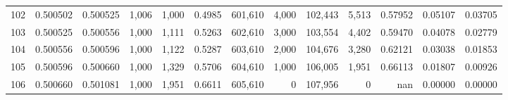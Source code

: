 \begin{tabular}{rrrrrrrrrrrrr}
102 &  0.500502 &  0.500525 &   1,006 &  1,000 &                                     0.4985 &  601,610 &    4,000 &  102,443 &    5,513 &  0.57952 &  0.05107 &  0.03705 \\
103 &  0.500525 &  0.500556 &   1,000 &  1,111 &                                     0.5263 &  602,610 &    3,000 &  103,554 &    4,402 &  0.59470 &  0.04078 &  0.02779 \\
104 &  0.500556 &  0.500596 &   1,000 &  1,122 &                                     0.5287 &  603,610 &    2,000 &  104,676 &    3,280 &  0.62121 &  0.03038 &  0.01853 \\
105 &  0.500596 &  0.500660 &   1,000 &  1,329 &                                     0.5706 &  604,610 &    1,000 &  106,005 &    1,951 &  0.66113 &  0.01807 &  0.00926 \\
106 &  0.500660 &  0.501081 &   1,000 &  1,951 &                                     0.6611 &  605,610 &        0 &  107,956 &        0 &      nan &  0.00000 &  0.00000 \\
\bottomrule
\end{tabular}
